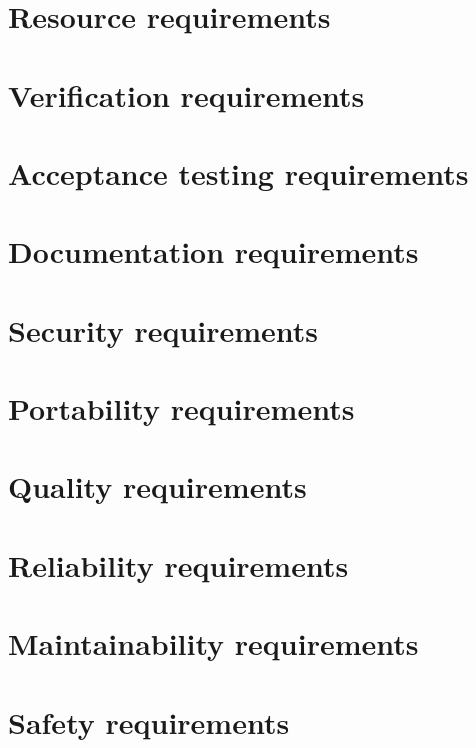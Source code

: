 \documentclass{article}
\begin{document}
\section{Resource requirements}
\section{Verification requirements}
\section{Acceptance testing requirements}
\section{Documentation requirements}
\section{Security requirements}
\section{Portability requirements}
\section{Quality requirements}
\section{Reliability requirements}
\section{Maintainability requirements}
\section{Safety requirements}
\end{document}
